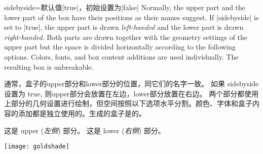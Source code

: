 \begin{docTcbKey}{sidebyside}{=}{默认值|true|，初始设置为|false|}
Normally, the upper part and the lower part of the box have their positions
as their names suggest. If |sidebyside| is set to |true|, the upper part
is drawn \emph{left-handed} and the lower part is drawn \emph{right-handed}.
Both parts are drawn together with the geometry settings of the upper part but the
space is divided horizontally according to the following options.
Colors, fonts, and box content additions are used individually.
The resulting box is unbreakable.




通常，盒子的upper部分和lower部分的位置，同它们的名字一致。
如果 sidebyside 设置为 true, 则upper部分会放置在左边，lower部分放置在右边。
两个部分都使用上部分的几何设置进行绘制，但空间按照以下选项水平分割。颜色、字体和盒子内容的添加都是独立使用的。生成的盒子是的。


\begin{dispExample}

\begin{tcolorbox}[title=我的标题,sidebyside]
这是 upper (\textit{左侧}) 部分。
\tcblower
这是 lower (\textit{右侧}) 部分。
\end{tcolorbox}
\end{dispExample}


\begin{dispExample}
\begin{tcolorbox}[bicolor%
,sidebyside%
,righthand width=3cm%
,sharp corners,boxrule=.4pt,colback=green!5,colbacklower=green!50!black!50]
\lipsum[2]
\tcblower
\texttt{[image: goldshade]}%
\end{tcolorbox}
\end{dispExample}
\end{docTcbKey}